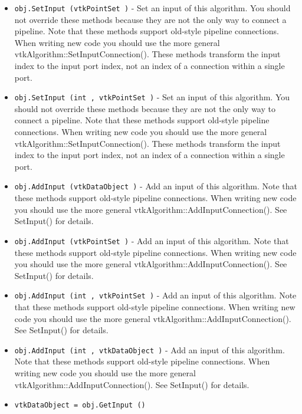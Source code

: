 \begin{itemize}
\item  \verb|obj.SetInput (vtkPointSet )| -  Set an input of this algorithm. You should not override these
 methods because they are not the only way to connect a pipeline.
 Note that these methods support old-style pipeline connections.
 When writing new code you should use the more general
 vtkAlgorithm::SetInputConnection().  These methods transform the
 input index to the input port index, not an index of a connection
 within a single port.

\item  \verb|obj.SetInput (int , vtkPointSet )| -  Set an input of this algorithm. You should not override these
 methods because they are not the only way to connect a pipeline.
 Note that these methods support old-style pipeline connections.
 When writing new code you should use the more general
 vtkAlgorithm::SetInputConnection().  These methods transform the
 input index to the input port index, not an index of a connection
 within a single port.

\item  \verb|obj.AddInput (vtkDataObject )| -  Add an input of this algorithm.  Note that these methods support
 old-style pipeline connections.  When writing new code you should
 use the more general vtkAlgorithm::AddInputConnection().  See
 SetInput() for details.

\item  \verb|obj.AddInput (vtkPointSet )| -  Add an input of this algorithm.  Note that these methods support
 old-style pipeline connections.  When writing new code you should
 use the more general vtkAlgorithm::AddInputConnection().  See
 SetInput() for details.

\item  \verb|obj.AddInput (int , vtkPointSet )| -  Add an input of this algorithm.  Note that these methods support
 old-style pipeline connections.  When writing new code you should
 use the more general vtkAlgorithm::AddInputConnection().  See
 SetInput() for details.

\item  \verb|obj.AddInput (int , vtkDataObject )| -  Add an input of this algorithm.  Note that these methods support
 old-style pipeline connections.  When writing new code you should
 use the more general vtkAlgorithm::AddInputConnection().  See
 SetInput() for details.

\item  \verb|vtkDataObject = obj.GetInput ()|

\end{itemize}
